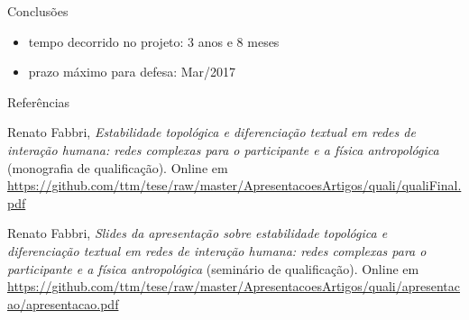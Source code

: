 \documentclass[10pt]{beamer}
\begin{document}
\begin{frame}{Conclusões}
\begin{itemize}
	\item tempo decorrido no projeto: 3 anos e 8 meses
	\item prazo máximo para defesa: Mar/2017
\end{itemize}
\end{frame}
%
%


\begin{frame}{Referências}
  \begin{thebibliography}{99}
	  Renato Fabbri, \emph{Estabilidade topológica e diferenciação textual em redes de interação humana: redes complexas para o participante e a física antropológica} (monografia de qualificação). Online em
	  \url{https://github.com/ttm/tese/raw/master/ApresentacoesArtigos/quali/qualiFinal.pdf}

	  Renato Fabbri, \emph{Slides da apresentação sobre estabilidade topológica e diferenciação textual em redes de interação humana: redes complexas para o participante e a física antropológica} (seminário de qualificação). Online em
	  \url{https://github.com/ttm/tese/raw/master/ApresentacoesArtigos/quali/apresentacao/apresentacao.pdf}

  \end{thebibliography}
\end{frame}

\begin{frame}
\Large
\begin{center}
\end{center}
\end{frame}
\end{document}
